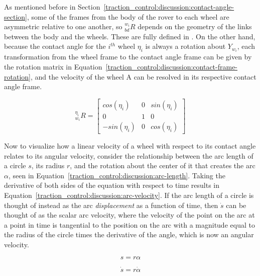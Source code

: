 As mentioned before in Section~\ref{traction_control:discussion:contact-angle-section}, some of the frames from the body of the rover to each wheel are asymmetric relative to one another, so ${}^{w_{i}}_{bd}R$ depends on the geometry of the links between the body and the wheels. These are fully defined in \cite{tractl}. On the other hand, because the contact angle for the $i^{th}$ wheel $\eta_{i}$ is always a rotation about $Y_{w_{i}}$, each transformation from the wheel frame to the contact angle frame can be given by the rotation matrix in Equation~\ref{traction_control:discussion:contact-frame-rotation}, and the velocity of the wheel A can be resolved in its respective contact angle frame.

\begin{equation}\label{traction_control:discussion:contact-frame-rotation}
	{}^{\eta_{i}}_{w_{i}}R = \left[\begin{array}{ccc}
		cos(\eta_{i})  & 0 & sin(\eta_{i}) \\
		0              & 1 & 0 \\
		-sin(\eta_{i}) & 0 & cos(\eta_{i})
	\end{array}\right]
\end{equation}

Now to visualize how a linear velocity of a wheel with respect to its contact angle relates to its angular velocity, consider the relationship between the arc length of a circle $s$, its radius $r$, and the rotation about the center of it that creates the arc $\alpha$, seen in Equation~\ref{traction_control:discussion:arc-length}. Taking the derivative of both sides of the equation with respect to time results in Equation~\ref{traction_control:discussion:arc-velocity}. If the arc length of a circle is thought of instead as the arc \textit{displacement} as a function of time, then $\dot{s}$ can be thought of as the scalar arc velocity, where the velocity of the point on the arc at a point in time is tangential to the position on the arc with a magnitude equal to the radius of the circle times the derivative of the angle, which is now an angular velocity.

\begin{equation}\label{traction_control:discussion:arc-length}
	s = r \alpha
\end{equation}

\begin{equation}\label{traction_control:discussion:arc-velocity}
	\dot{s} = r \dot{\alpha}
\end{equation}

